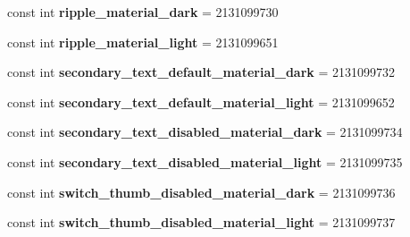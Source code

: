 \begin{DoxyCompactItemize}
\mbox{\label{classst_delivery_1_1_resource_1_1_color_a56cc3e10bae3d01660952ddb59911de5}} 
const int {\bfseries ripple\+\_\+material\+\_\+dark} = 2131099730
\item 
\mbox{\label{classst_delivery_1_1_resource_1_1_color_a5f3c3cf71c41bfd8df047aaf3dfb9d92}} 
const int {\bfseries ripple\+\_\+material\+\_\+light} = 2131099651
\item 
\mbox{\label{classst_delivery_1_1_resource_1_1_color_a7a3ffb2c6aeb0ccccbadb8fb01d852e8}} 
const int {\bfseries secondary\+\_\+text\+\_\+default\+\_\+material\+\_\+dark} = 2131099732
\item 
\mbox{\label{classst_delivery_1_1_resource_1_1_color_a478a12077ba045b5a2b50b0210b567d8}} 
const int {\bfseries secondary\+\_\+text\+\_\+default\+\_\+material\+\_\+light} = 2131099652
\item 
\mbox{\label{classst_delivery_1_1_resource_1_1_color_adcf61d87fa6c68c5f2fe2435ac581c94}} 
const int {\bfseries secondary\+\_\+text\+\_\+disabled\+\_\+material\+\_\+dark} = 2131099734
\item 
\mbox{\label{classst_delivery_1_1_resource_1_1_color_a0d2b6a1f8d8c8da5f8dc4589e13257d6}} 
const int {\bfseries secondary\+\_\+text\+\_\+disabled\+\_\+material\+\_\+light} = 2131099735
\item 
\mbox{\label{classst_delivery_1_1_resource_1_1_color_a311cb89b6f7583a8c7d3cf64006b3fd2}} 
const int {\bfseries switch\+\_\+thumb\+\_\+disabled\+\_\+material\+\_\+dark} = 2131099736
\item 
\mbox{\label{classst_delivery_1_1_resource_1_1_color_a9d45833508d429b3f7f05684ba4f5d65}} 
const int {\bfseries switch\+\_\+thumb\+\_\+disabled\+\_\+material\+\_\+light} = 2131099737
\item 
\mbox{\label{classst_delivery_1_1_resource_1_1_color_a87d7052b20d202cb5880d4e3ebdb0e90}} 

\end{DoxyCompactItemize}
